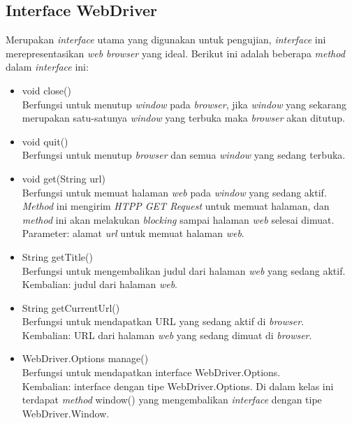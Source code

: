 \subsection{Interface WebDriver}
\label{subsec:webdriver}
Merupakan \textit{interface} utama yang digunakan untuk pengujian, \textit{interface} ini merepresentasikan \textit{web browser} yang ideal. Berikut ini adalah beberapa \textit{method} dalam \textit{interface} ini:
\begin{itemize}
\item void close()\\
Berfungsi untuk menutup \textit{window} pada \textit{browser}, jika \textit{window} yang sekarang merupakan satu-satunya \textit{window} yang terbuka maka \textit{browser} akan ditutup.
\item void quit()\\
Berfungsi untuk menutup \textit{browser} dan semua \textit{window} yang sedang terbuka.
\item void get(String url)\\
Berfungsi untuk memuat halaman \textit{web} pada \textit{window} yang sedang aktif. \textit{Method} ini mengirim \textit{HTPP GET Request} untuk memuat halaman, dan \textit{method} ini akan melakukan \textit{blocking} sampai halaman \textit{web} selesai dimuat.\\
Parameter: alamat \textit{url} untuk memuat halaman \textit{web}.
\item String getTitle()\\
Berfungsi untuk mengembalikan judul dari halaman \textit{web} yang sedang aktif.\\
Kembalian: judul dari halaman \textit{web}.
\item String getCurrentUrl()\\
Berfungsi untuk mendapatkan URL yang sedang aktif di \textit{browser}.\\
Kembalian: URL dari halaman \textit{web} yang sedang dimuat di \textit{browser}.

\item WebDriver.Options manage()\\
Berfungsi untuk mendapatkan interface WebDriver.Options.\\
Kembalian: interface dengan tipe WebDriver.Options. Di dalam kelas ini terdapat \textit{method} window() yang mengembalikan \textit{interface} dengan tipe WebDriver.Window. 
\end{itemize}

